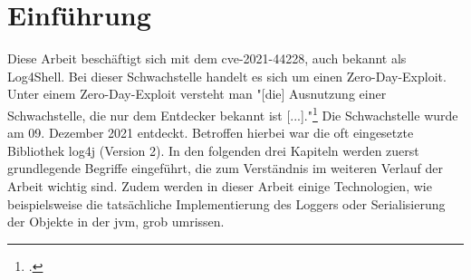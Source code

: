 
\section{Einführung}\label{sec:einfuhrung}
Diese Arbeit beschäftigt sich mit dem \gls{cve}-2021-44228, auch bekannt als Log4Shell. Bei dieser Schwachstelle handelt es sich
um einen Zero-Day-Exploit. Unter einem Zero-Day-Exploit versteht man "[die] Ausnutzung einer Schwachstelle, die nur dem Entdecker bekannt ist [...]."\footcite{bsizeroday}
Die Schwachstelle wurde am 09. Dezember 2021 entdeckt. Betroffen hierbei war die oft eingesetzte Bibliothek log4j (Version 2). In den
folgenden drei Kapiteln werden zuerst grundlegende Begriffe eingeführt, die zum Verständnis im weiteren Verlauf der Arbeit wichtig sind.
Zudem werden in dieser Arbeit einige Technologien, wie beispielsweise die tatsächliche Implementierung des Loggers oder Serialisierung der Objekte in der
\gls{jvm}, grob umrissen.



